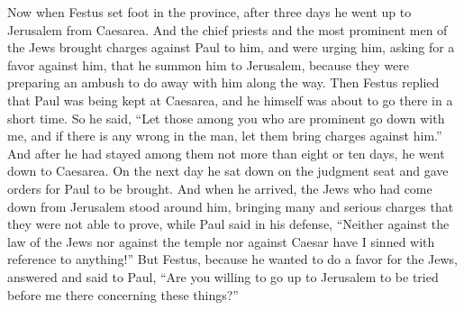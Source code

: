 \begin{biblechapter} %
 Now when Festus set foot in the province, after three days he went up to Jerusalem from Caesarea.
\verse And the chief priests and the most prominent men of the Jews brought charges against Paul to him, and were urging him,
\verse asking for a favor against him, that he summon him to Jerusalem, because they were preparing an ambush to do away with him along the way.
\verse Then Festus replied that Paul was being kept at Caesarea, and he himself was about to go there in a short time.
\verse So he said, “Let those among you who are prominent go down with me, and if there is any wrong in the man, let them bring charges against him.”
\verse And after he had stayed among them not more than eight or ten days, he went down to Caesarea. On the next day he sat down on the judgment seat and gave orders for Paul to be brought.
\verse And when he arrived, the Jews who had come down from Jerusalem stood around him, bringing many and serious charges that they were not able to prove,
\verse while Paul said in his defense, “Neither against the law of the Jews nor against the temple nor against Caesar have I sinned with reference to anything!”
\verse But Festus, because he wanted to do a favor for the Jews, answered and said to Paul, “Are you willing to go up to Jerusalem to be tried before me there concerning these things?”

\end{biblechapter}
